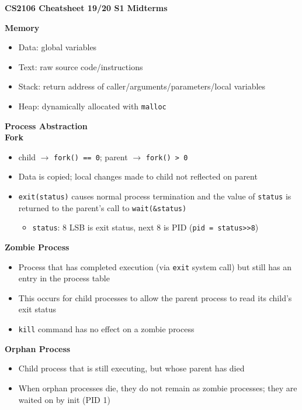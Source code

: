 \documentclass[a4paper, 12pt]{article}
\begin{document}
\setlength\parindent{0pt}
\setlength{\multicolsep}{1.0pt plus 2.0pt minus 1.5pt}%
\scriptsize
{}

\begin{center}
{\normalsize\textbf{CS2106 Cheatsheet 19/20 S1 Midterms}}
\end{center}
\begin{multicols*}{3}
\noindent
{\small\textbf{Memory}}
\begin{itemize}
	\item Data: global variables
	\item Text: raw source code/instructions
	\item Stack: return address of caller/arguments/parameters/local variables
	\item Heap: dynamically allocated with \texttt{malloc}
\end{itemize}

\medskip

{\small\textbf{Process Abstraction}} \\
\textbf{Fork}
\begin{itemize}
	\item child $\rightarrow$ \texttt{fork() == 0}; parent $\rightarrow$ \texttt{fork() > 0}
	\item Data is copied; local changes made to child not reflected on parent
\end{itemize}
\begin{itemize}
	\item \texttt{exit(status)} causes normal process termination and the value of \texttt{status} is returned to the parent's call to \texttt{wait(\&status)}
	\begin{itemize}
		\item \texttt{status}: 8 LSB is exit status, next 8 is PID (\texttt{pid = status>>8})
	\end{itemize}
\end{itemize}
\textbf{Zombie Process}
\begin{itemize}
	\item Process that has completed execution (via \texttt{exit} system call) but still has an entry in the process table
	\item This occurs for child processes to allow the parent process to read its child’s exit status
	\item \texttt{kill} command has no effect on a zombie process
\end{itemize}
\textbf{Orphan Process}
\begin{itemize}
	\item Child process that is still executing, but whose parent has died
	\item When orphan processes die, they do not remain as zombie processes; they are waited on by init (PID 1)
\end{itemize}


\end{multicols*}
\end{document}
